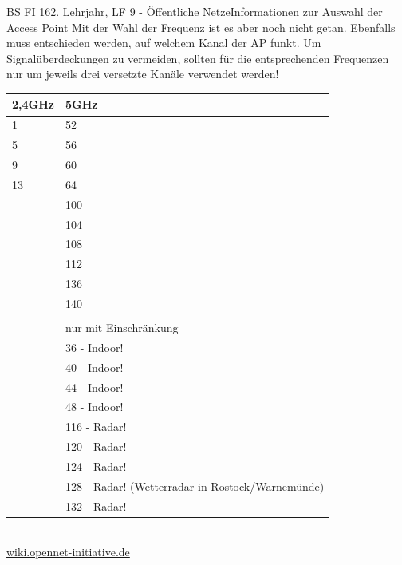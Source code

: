 \documentclass[11pt,twocolumn,oneside,openany,headings=optiontotoc,11pt,numbers=noenddot]{article}
\begin{document}
\begin{worksheet}{BS FI 16}{2. Lehrjahr, LF 9 - Öffentliche Netze}{Informationen zur Auswahl der Access Point}
		Mit der Wahl der Frequenz ist es aber noch nicht getan. Ebenfalls muss entschieden werden, auf welchem Kanal der AP funkt. Um Signalüberdeckungen zu vermeiden, sollten für die entsprechenden Frequenzen nur um jeweils drei versetzte Kanäle verwendet werden!\\
		\par\noindent
		\begin{tabularx}{0.5\textwidth}{X|X}
			2,4GHz & 5GHz\\
			\hline
			1 & 52\\
			5 & 56\\
			9 & 60\\
			13 & 64\\
			& 100\\
			& 104\\
			& 108\\
			& 112\\
			& 136\\
			& 140\\
			\cline{2-2}\\
			& nur mit Einschränkung\\
			\cline{2-2}
			& 36 - Indoor!\\
			& 40 - Indoor!\\
			& 44 - Indoor!\\
			& 48 - Indoor!\\
			& 116 - Radar!\\
			& 120 - Radar!\\
			& 124 - Radar!\\
			& 128 - Radar! (Wetterradar in Rostock/Warnemünde)\\
			& 132 - Radar!\\
		\end{tabularx}\\
		\tiny{\href{https://wiki.opennet-initiative.de/wiki/WLAN_Frequenzen#Nutzbare_WLAN_Kan.C3.A4le}{wiki.opennet-initiative.de}}\normalsize
		\newpage \noindent

\end{worksheet}
\end{document}
